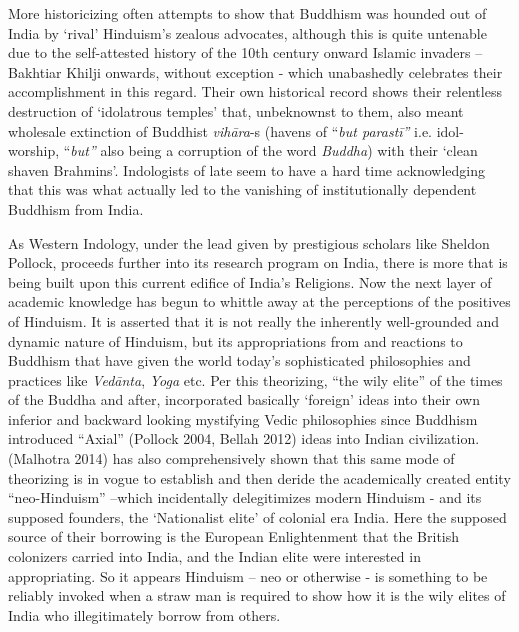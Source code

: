 More historicizing often attempts to show that Buddhism was hounded out of India by ‘rival’ Hinduism’s zealous advocates, although this is quite untenable due to the self-attested history of the 10th century onward Islamic invaders – Bakhtiar Khilji onwards, without exception - which unabashedly celebrates their accomplishment in this regard. Their own historical record shows their relentless destruction of ‘idolatrous temples’ that, unbeknownst to them, also meant wholesale extinction of Buddhist \textit{vihāra}-s (havens of “\textit{but parastī”} i.e. idol-worship, “\textit{but”} also being a corruption of the word \textit{Buddha}) with their ‘clean shaven Brahmins’. Indologists of late seem to have a hard time acknowledging that this was what actually led to the vanishing of institutionally dependent Buddhism from India.

As Western Indology, under the lead given by prestigious scholars like Sheldon Pollock, proceeds further into its research program on India, there is more that is being built upon this current edifice of India’s Religions. Now the next layer of academic knowledge has begun to whittle away at the perceptions of the positives of Hinduism. It is asserted that it is not really the inherently well-grounded and dynamic nature of Hinduism, but its appropriations from and reactions to Buddhism that have given the world today’s sophisticated philosophies and practices like \textit{Vedānta}, \textit{Yoga} etc. Per this theorizing, “the wily elite” of the times of the Buddha and after, incorporated basically ‘foreign’ ideas into their own inferior and backward looking mystifying Vedic philosophies since Buddhism introduced “Axial” (Pollock 2004, Bellah 2012) ideas into Indian civilization. (Malhotra 2014) has also comprehensively shown that this same mode of theorizing is in vogue to establish and then deride the academically created entity “neo-Hinduism” –which incidentally delegitimizes modern Hinduism - and its supposed founders, the ‘Nationalist elite’ of colonial era India. Here the supposed source of their borrowing is the European Enlightenment that the British colonizers carried into India, and the Indian elite were interested in appropriating. So it appears Hinduism – neo or otherwise - is something to be reliably invoked when a straw man is required to show how it is the wily elites of India who illegitimately borrow from others.

